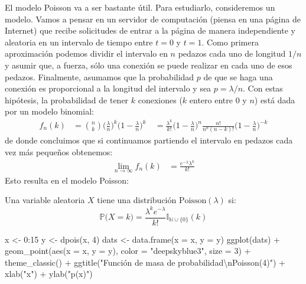 \documentclass[
]{book}
\newenvironment{Shaded}{\begin{snugshade}}{\end{snugshade}}
\newcommand{\AttributeTok}[1]{\textcolor[rgb]{0.77,0.63,0.00}{#1}}
\newcommand{\DecValTok}[1]{\textcolor[rgb]{0.00,0.00,0.81}{#1}}
\newcommand{\FunctionTok}[1]{\textcolor[rgb]{0.00,0.00,0.00}{#1}}
\newcommand{\NormalTok}[1]{#1}
\newcommand{\OtherTok}[1]{\textcolor[rgb]{0.56,0.35,0.01}{#1}}
\newcommand{\SpecialCharTok}[1]{\textcolor[rgb]{0.00,0.00,0.00}{#1}}
\newcommand{\StringTok}[1]{\textcolor[rgb]{0.31,0.60,0.02}{#1}}
\begin{document}
El modelo Poisson va a ser bastante útil. Para estudiarlo, consideremos un modelo. Vamos a pensar en un servidor de computación (piensa en una página de Internet) que recibe solicitudes de entrar a la página de manera independiente y aleatoria en un intervalo de tiempo entre \(t = 0\) y \(t = 1\). Como primera aproximación podemos dividir el intervalo en \(n\) pedazos cada uno de longitud \(1/n\) y asumir que, a fuerza, sólo una conexión se puede realizar en cada uno de esos pedazos. Finalmente, asumamos que la probabilidad \(p\) de que se haga una conexión es proporcional a la longitud del intervalo y sea \(p = \lambda / n\). Con estas hipótesis, la probabilidad de tener \(k\) conexiones (\(k\) entero entre \(0\) y \(n\)) está dada por un modelo binomial:
\begin{equation}\nonumber
\begin{aligned}
f_n(k) & = \binom{n}{k} \Big( \frac{\lambda}{n} \Big)^k \Big(1 - \frac{\lambda}{n} \Big)^k \
& = \frac{\lambda^k}{k!} \Big( 1 - \frac{\lambda}{n})^n \frac{n!}{n^k(n-k)!} \Big( 1 - \frac{\lambda}{n})^{-k}
\end{aligned}
\end{equation}
de donde concluimos que si continuamos partiendo el intervalo en pedazos cada vez más pequeños obtenemos:
\begin{equation}\nonumber
\begin{aligned}
\lim_{n \to \infty} f_n(k) & = \frac{e^{-\lambda} \lambda^k}{k!}
\end{aligned}
\end{equation}
Esto resulta en el modelo Poisson:

Una variable aleatoria \(X\) tiene una distribución \(\text{Poisson}(\lambda)\) si:
\[
\mathbb{P}\big(X = k \big) = \dfrac{\lambda^k e^{-\lambda}}{k!} \mathbb{I}_{\mathbb{N}\cup \{ 0 \}}(k)
\]

\begin{Shaded}
\begin{Highlighting}[]
\NormalTok{x }\OtherTok{\textless{}{-}} \DecValTok{0}\SpecialCharTok{:}\DecValTok{15}
\NormalTok{y }\OtherTok{\textless{}{-}} \FunctionTok{dpois}\NormalTok{(x, }\DecValTok{4}\NormalTok{)}
\NormalTok{dats }\OtherTok{\textless{}{-}} \FunctionTok{data.frame}\NormalTok{(}\AttributeTok{x =}\NormalTok{ x, }\AttributeTok{y =}\NormalTok{ y)}
\FunctionTok{ggplot}\NormalTok{(dats) }\SpecialCharTok{+} \FunctionTok{geom\_point}\NormalTok{(}\FunctionTok{aes}\NormalTok{(}\AttributeTok{x =}\NormalTok{ x, }\AttributeTok{y =}\NormalTok{ y), }\AttributeTok{color =} \StringTok{"deepskyblue3"}\NormalTok{, }\AttributeTok{size =} \DecValTok{3}\NormalTok{) }\SpecialCharTok{+} \FunctionTok{theme\_classic}\NormalTok{() }\SpecialCharTok{+} \FunctionTok{ggtitle}\NormalTok{(}\StringTok{"Función de masa de probabilidad}\SpecialCharTok{\textbackslash{}n}\StringTok{Poisson(4)"}\NormalTok{) }\SpecialCharTok{+}
  \FunctionTok{xlab}\NormalTok{(}\StringTok{"x"}\NormalTok{) }\SpecialCharTok{+} \FunctionTok{ylab}\NormalTok{(}\StringTok{"p(x)"}\NormalTok{)}
\end{Highlighting}
\end{Shaded}
\end{document}
